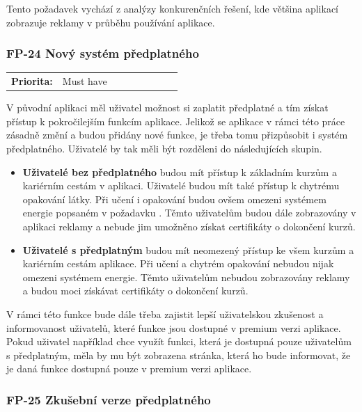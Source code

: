 Tento požadavek vychází z analýzy konkurenčních řešení, kde většina aplikací zobrazuje reklamy v průběhu používání aplikace.

\subsubsection{FP-24 Nový systém předplatného}\label{sec:fp-subscription-system}

\begin{tabular}{lp{0.7\linewidth}}
    \textbf{Priorita:} & Must have \\
\end{tabular}

V původní aplikaci měl uživatel možnost si zaplatit předplatné a tím získat přístup k pokročilejším funkcím aplikace. Jelikož se aplikace v rámci této práce zásadně změní a budou přidány nové funkce, je třeba tomu přizpůsobit i systém předplatného. Uživatelé by tak měli být rozděleni do následujících skupin.

\begin{itemize}
    \item \textbf{Uživatelé bez předplatného} budou mít přístup k základním kurzům a kariérním cestám v aplikaci. Uživatelé budou mít také přístup k chytrému opakování látky. Při učení i opakování budou ovšem omezeni systémem energie popsaném v požadavku . Těmto uživatelům budou dále zobrazovány v aplikaci reklamy a nebude jim umožněno získat certifikáty o dokončení kurzů.
    \item \textbf{Uživatelé s předplatným} budou mít neomezený přístup ke všem kurzům a kariérním cestám aplikace. Při učení a chytrém opakování nebudou nijak omezeni systémem energie. Těmto uživatelům nebudou zobrazovány reklamy a budou moci získávat certifikáty o dokončení kurzů.
\end{itemize}

V rámci této funkce bude dále třeba zajistit lepší uživatelskou zkušenost a informovanost uživatelů, které funkce jsou dostupné v premium verzi aplikace. Pokud uživatel například chce využít funkci, která je dostupná pouze uživatelům s předplatným, měla by mu být zobrazena stránka, která ho bude informovat, že je daná funkce dostupná pouze v premium verzi aplikace.

\subsubsection{FP-25 Zkušební verze předplatného}\label{sec:fp-free-trial}

